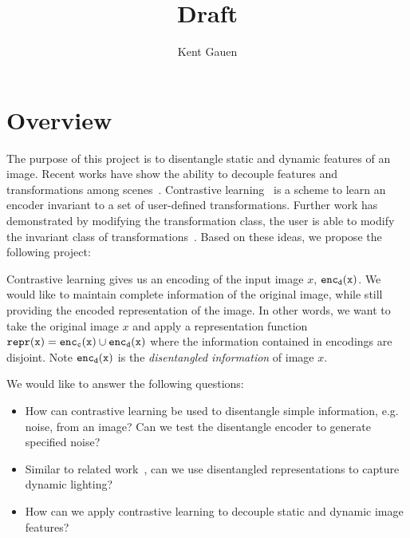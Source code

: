 \documentclass[11pt]{article}
\author{Kent Gauen}
\title{Draft}
\begin{document}
\maketitle

\section{Overview}

The purpose of this project is to disentangle static and dynamic features of an image.
Recent works have show the ability to decouple features and transformations among scenes~\cite{liu2020learning}. Contrastive learning~\cite{chen2020simple,xiao2020should} is a scheme to learn an encoder invariant to a set of user-defined transformations. Further work has demonstrated by modifying the transformation class, the user is able to modify the invariant class of transformations~\cite{xiao2020should}. Based on these ideas, we propose the following project:

Contrastive learning gives us an encoding of the input image $x$, $\tt{enc}_{d}(x)$. We would like to maintain complete information of the original image, while still providing the encoded representation of the image. In other words, we want to take the original image $x$ and apply a representation function $\tt{repr}(x) = \tt{enc}_{c}(x) \cup \tt{enc}_{d}(x)$ where the information contained in encodings are disjoint. Note $\tt{enc}_{d}(x)$ is the \emph{disentangled information} of image $x$. 

We would like to answer the following questions:


\begin{itemize}
\item How can contrastive learning be used to disentangle simple information, e.g. noise, from an image? Can we test the disentangle encoder to generate specified noise?
\item Similar to related work~\cite{xiao2020should}, can we use disentangled representations to capture dynamic lighting?
\item How can we apply contrastive learning to decouple static and dynamic image features?
\end{itemize}
\end{document}
